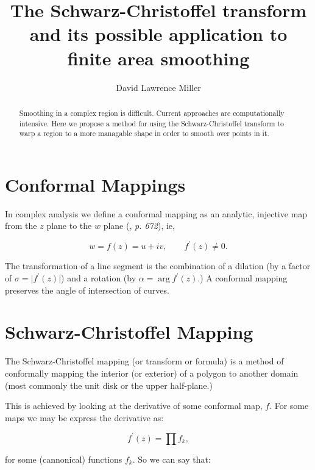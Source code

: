 \documentclass[a4paper,10pt]{amsart}
\title{The Schwarz-Christoffel transform and its possible application to finite area smoothing}
\author{David Lawrence Miller}
\newcommand{\sch}{Schwarz-Christoffel }
\newcommand{\fprime}{f^\prime(z)}
\begin{document}
 
\begin{abstract}
Smoothing in a complex region is difficult. Current approaches are computationally intensive. Here we propose a method for using the \sch transform to warp a region to a more managable shape in order to smooth over points in it.
\end{abstract}
 
 
\newtheorem{thm}{Theorem}[section]
 
\newtheorem{defn}{Definition}[section]
 
\maketitle
 
\section{Conformal Mappings}

In complex analysis we define a conformal mapping as an analytic, injective map from the $z$ plane to the $w$ plane (\cite{handbuch}, \emph{p. 672}), ie,

\begin{equation*}
w=f(z)=u+iv, \qquad f^\prime(z) \neq 0.
\end{equation*} 

The transformation of a line segment is the combination of a dilation (by a factor of $\sigma=\vert f^\prime(z) \vert$) and a rotation (by $\alpha = \arg f^\prime(z)$.) A conformal mapping preserves the angle of intersection of curves.

\section{\sch Mapping}

The \sch mapping (or transform or formula) is a method of conformally mapping the interior (or exterior) of a polygon to another domain (most commonly the unit disk or the upper half-plane.)

This is achieved by looking at the derivative of some conformal map, $f$. For some maps we may be express the derivative as:

\begin{equation}
\fprime = \prod f_k,
\end{equation}

for some (cannonical) functions $f_k$. So we can say that:
\end{document}
